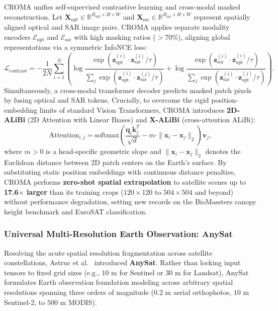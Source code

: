 CROMA unifies self-supervised contrastive learning and cross-modal masked reconstruction. Let $\mathbf{X}_{\text{opt}} \in \mathbb{R}^{B_{\text{opt}} \times H \times W}$ and $\mathbf{X}_{\text{sar}} \in \mathbb{R}^{B_{\text{sar}} \times H \times W}$ represent spatially aligned optical and SAR image pairs. CROMA applies separate modality encoders $\mathcal{E}_{\text{opt}}$ and $\mathcal{E}_{\text{sar}}$ with high masking ratios ($>70\%$), aligning global representations via a symmetric InfoNCE loss:
\begin{equation}
    \mathcal{L}_{\text{contrast}} = -\frac{1}{2N} \sum_{i=1}^N \left( \log \frac{\exp(\mathbf{z}_{\text{opt}}^{(i)} \cdot \mathbf{z}_{\text{sar}}^{(i)} / \tau)}{\sum_j \exp(\mathbf{z}_{\text{opt}}^{(i)} \cdot \mathbf{z}_{\text{sar}}^{(j)} / \tau)} + \log \frac{\exp(\mathbf{z}_{\text{sar}}^{(i)} \cdot \mathbf{z}_{\text{opt}}^{(i)} / \tau)}{\sum_j \exp(\mathbf{z}_{\text{sar}}^{(i)} \cdot \mathbf{z}_{\text{opt}}^{(j)} / \tau)} \right).
    \label{eq:croma_contrast}
\end{equation}
Simultaneously, a cross-modal transformer decoder predicts masked patch pixels by fusing optical and SAR tokens. Crucially, to overcome the rigid position-embedding limits of standard Vision Transformers, CROMA introduces \textbf{2D-ALiBi} (2D Attention with Linear Biases) and \textbf{X-ALiBi} (cross-attention ALiBi):
\begin{equation}
    \text{Attention}_{i, j} = \text{softmax}\left( \frac{\mathbf{q}_i \mathbf{k}_j^T}{\sqrt{d}} - m \cdot \|\mathbf{x}_i - \mathbf{x}_j\|_2 \right) \mathbf{v}_j,
    \label{eq:2d_alibi}
\end{equation}
where $m > 0$ is a head-specific geometric slope and $\|\mathbf{x}_i - \mathbf{x}_j\|_2$ denotes the Euclidean distance between 2D patch centers on the Earth's surface. By substituting static position embeddings with continuous distance penalties, CROMA performs \textbf{zero-shot spatial extrapolation} to satellite scenes up to \textbf{17.6$\times$ larger} than its training crops ($120 \times 120$ to $504 \times 504$ and beyond) without performance degradation, setting new records on the BioMassters canopy height benchmark and EuroSAT classification.

\subsubsection{Universal Multi-Resolution Earth Observation: AnySat}
Resolving the acute spatial resolution fragmentation across satellite constellations, Astruc et al.~\cite{astruc2024anysat} introduced \textbf{AnySat}. Rather than locking input tensors to fixed grid sizes (e.g., $10\text{ m}$ for Sentinel or $30\text{ m}$ for Landsat), AnySat formulates Earth observation foundation modeling across arbitrary spatial resolutions spanning three orders of magnitude ($0.2\text{ m}$ aerial orthophotos, $10\text{ m}$ Sentinel-2, to $500\text{ m}$ MODIS).

